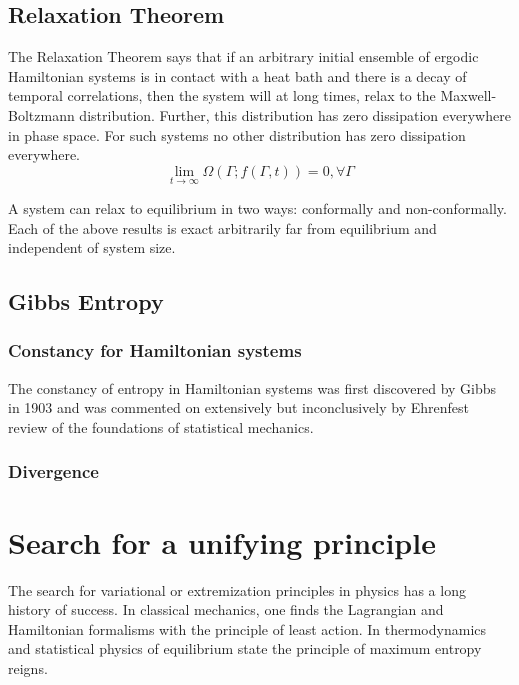 \documentclass[a4paper,12pt,nofootinbib]{article}
\begin{document}
\subsection{Relaxation Theorem}
The Relaxation Theorem says that if an arbitrary initial ensemble of ergodic Hamiltonian systems is in contact with a heat bath and there is a decay of temporal correlations, then the system will at long times, relax to the Maxwell-Boltzmann distribution. Further, this distribution has zero dissipation everywhere in phase space. For such systems no other distribution has zero dissipation everywhere.
\begin{displaymath}
  \lim_{t\to \infty } \Omega (\Gamma ;f(\Gamma ,t))=0, \forall \Gamma
\end{displaymath}

A system can relax to equilibrium in two ways: conformally and non-conformally.
Each of the above results is exact arbitrarily far from equilibrium and independent of system size.

\subsection{Gibbs Entropy}

\subsubsection{Constancy for Hamiltonian systems}

The constancy of entropy in Hamiltonian systems was first discovered by Gibbs in 1903 and was commented on extensively but inconclusively by Ehrenfest review of the foundations of statistical mechanics.

\subsubsection{Divergence}




\section{Search for a unifying principle}

The search for variational or extremization principles in physics has a long history of success. In classical mechanics, one finds the Lagrangian and Hamiltonian formalisms with the principle of least action. In thermodynamics and statistical physics of equilibrium state the principle of maximum entropy reigns. 
\end{document}
